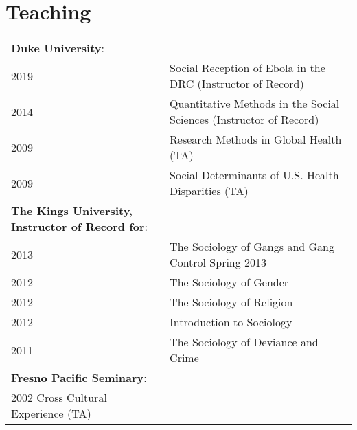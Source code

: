 \section*{Teaching}
\begin{tabular}{p{} p{}}
\textbf{Duke University}: & \\
2019 & Social Reception of Ebola in the DRC (Instructor of Record) \\
2014 & Quantitative Methods in the Social Sciences (Instructor of Record)\\
2009 & Research Methods in Global Health (TA) \\
2009 & Social Determinants of U.S. Health Disparities (TA)\\
\textbf{The Kings University, Instructor of Record for}: & \\
2013 & The Sociology of Gangs and Gang Control \hfill Spring 2013\\
2012 & The Sociology of Gender\\
2012 & The Sociology of Religion \\
2012 & Introduction to Sociology \\
2011 & The Sociology of Deviance and Crime \\
\textbf{Fresno Pacific Seminary}: & \\
2002 Cross Cultural Experience (TA) & \\
\end{tabular}